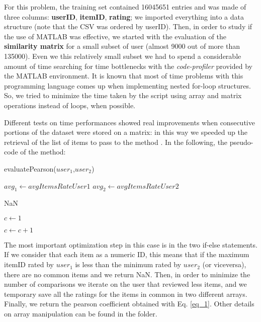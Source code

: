 For this problem, the training set contained 16045651 entries and was made of three columns: \textbf{userID}, \textbf{itemID}, \textbf{rating}; we imported everything into a  data structure (note that the CSV was ordered by userID). Then, in order to study if the use of MATLAB was effective, we started with the evaluation of the \textbf{similarity matrix} for a small subset of user (almost 9000 out of more than 135000). Even we this relatively small subset we had to spend a considerable amount of time searching for time bottlenecks with the \textit{code-profiler} provided by the MATLAB environment. It is known that most of time problems with this programming language comes up when implementing nested for-loop structures. So, we tried to minimize the time taken by the script using array and matrix operations instead of loops, when possible.

Different tests on time performances showed real improvements when consecutive portions of the dataset were stored on a matrix: in this way we speeded up the retrieval of the list of items to pass to the method . In the following, the pseudo-code of the method:
\begin{algorithm}
	\caption{evaluatePearson($user_1$,$user_2$)}
	\begin{algorithmic} 
		\STATE $avg_1 \leftarrow avgItemsRateUser1$
		\STATE $avg_2 \leftarrow avgItemsRateUser2$
	
		\RETURN NaN
		\ENDIF
		
		\STATE $c \leftarrow 1$
		
		\ENDIF
		\ENDFOR
		\ELSE
		\STATE $c \leftarrow c + 1$
		\ENDIF
		\ENDFOR
		\ENDIF
		
	\end{algorithmic}
\end{algorithm} 
The most important optimization step in this case is in the two if-else statements. If we consider that each item as a numeric ID, this means that if the maximum itemID rated by $user_1$ is less than the minimum rated by $user_2$ (or viceversa), there are no common items and we return NaN. Then, in order to minimize the number of comparisons we iterate on the user that reviewed less items, and we temporary save all the ratings for the items in common in two different arrays. Finally, we return the pearson coefficient obtained with Eq. \ref{eq_1}. Other details on array manipulation can be found in the  folder.

